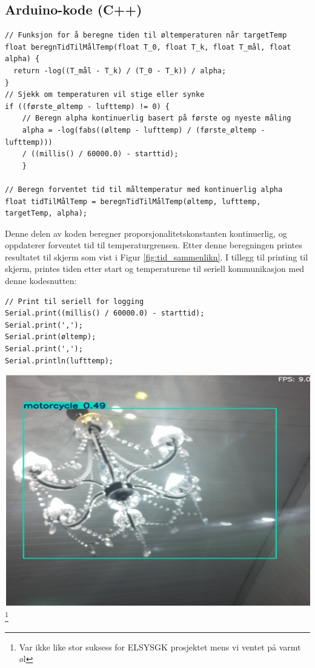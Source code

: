 \documentclass{article}
\begin{document}
\subsection{Arduino-kode (C++)}
\begin{verbatim}
// Funksjon for å beregne tiden til øltemperaturen når targetTemp
float beregnTidTilMålTemp(float T_0, float T_k, float T_mål, float alpha) {
  return -log((T_mål - T_k) / (T_0 - T_k)) / alpha;
}
// Sjekk om temperaturen vil stige eller synke
if ((første_øltemp - lufttemp) != 0) {
    // Beregn alpha kontinuerlig basert på første og nyeste måling
    alpha = -log(fabs((øltemp - lufttemp) / (første_øltemp - lufttemp))) 
    / ((millis() / 60000.0) - starttid);
    }

// Beregn forventet tid til måltemperatur med kontinuerlig alpha
float tidTilMålTemp = beregnTidTilMålTemp(øltemp, lufttemp, targetTemp, alpha);

\end{verbatim}
Denne delen av koden beregner proporsjonalitetskonstanten kontinuerlig, og oppdaterer forventet tid til temperaturgrensen. Etter denne beregningen printes resultatet til skjerm som vist i Figur \ref{fig:tid_sammenlikn}.
I tillegg til printing til skjerm, printes tiden etter start og temperaturene til seriell kommunikasjon med denne kodesnutten:
\begin{verbatim}
// Print til seriell for logging
Serial.print((millis() / 60000.0) - starttid);
Serial.print(',');
Serial.print(øltemp);
Serial.print(',');
Serial.println(lufttemp);
\end{verbatim}
\begin{center}
    \includegraphics[width=0.8\linewidth]{motorcycle.png}\footnote{Var ikke like stor suksess for ELSYSGK prosjektet mens vi ventet på varmt øl}
\end{center}
\vfill
\end{document}
